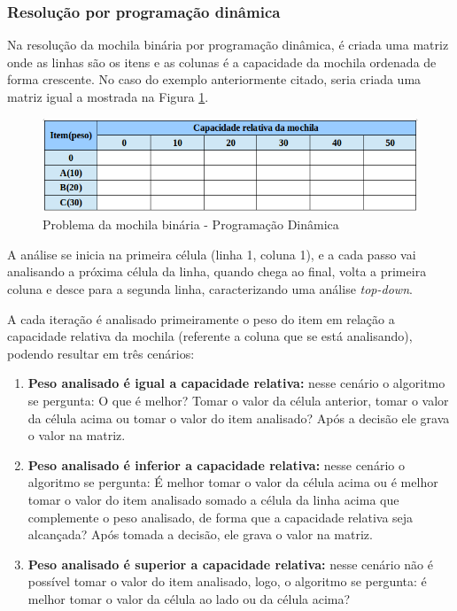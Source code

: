 \subsubsection{Resolução por programação dinâmica}
Na resolução da mochila binária por programação dinâmica, é criada uma matriz onde as linhas são os itens e as colunas é a capacidade da mochila ordenada de forma crescente. No caso do exemplo anteriormente citado, seria criada uma matriz igual a mostrada na Figura \ref{matriz}.

\FloatBarrier
\begin{figure}[!h]
\centering
\includegraphics[keepaspectratio=true,scale=0.5]{figuras/matriz.png}
\caption{Problema da mochila binária - Programação Dinâmica}
\label{matriz}
\end{figure}

A análise se inicia na primeira célula (linha 1, coluna 1), e a cada passo vai analisando a próxima célula da linha, quando chega ao final, volta a primeira coluna e desce para a segunda linha, caracterizando uma análise \textit{top-down}. 

A cada iteração é analisado primeiramente o peso do item em relação a capacidade relativa da mochila (referente a coluna que se está analisando), podendo resultar em três cenários: 
\begin{enumerate}
\item \textbf{Peso analisado é igual a capacidade relativa:} nesse cenário o algoritmo se pergunta: O que é melhor? Tomar o valor da célula anterior, tomar o valor da célula acima ou tomar o valor do item analisado? Após a decisão ele grava o valor na matriz.
\item \textbf{Peso analisado é inferior a capacidade relativa:} nesse cenário o algoritmo se pergunta: É melhor tomar o valor da célula acima ou é melhor tomar o valor do item analisado somado a célula da linha acima que complemente o peso analisado, de forma que a capacidade relativa seja alcançada? Após tomada a decisão, ele grava o valor na matriz. 
\item \textbf{Peso analisado é superior a capacidade relativa:} nesse cenário não é possível tomar o valor do item analisado, logo, o algoritmo se pergunta: é melhor tomar o valor da célula ao lado ou da célula acima? 
\end{enumerate}

